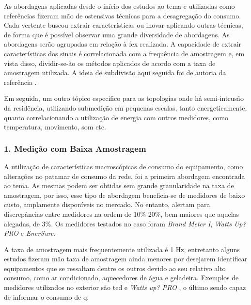 As abordagens aplicadas desde o início dos estudos ao tema e
utilizadas como referências fizeram mão de ostensivas técnicas para a
desagregação do consumo. Cada vertente buscou extrair características
ou inovar aplicando outras técnicas, de forma que é possível observar
uma grande diversidade de abordagens. As abordagens serão agrupadas em
relação à \gls{fex} realizada. A capacidade de extrair
características dos sinais é correlacionada com a frequência de
amostragem e, em vista disso, dividir-se-ão os métodos aplicados de
acordo com a taxa de amostragem utilizada. A ideia de subdivisão aqui
seguida foi de autoria da referência \cite{nilm_zeifman_review_2011}.

Em seguida, um outro tópico especifico para as topologias onde há
semi-intrusão da residência, utilizando submedição em pequenas
escalas, tanto energeticamente, quanto correlacionando a utilização de
energia com outros medidores, como temperatura, movimento, som etc.

\subsubsection{1. Medição com Baixa Amostragem}
\label{top:nilm_baixa_am}

A utilização de características macroscópicas de consumo do equipamento,
como alterações no patamar de consumo da rede, foi a
primeira abordagem encontrada ao tema. As mesmas podem ser obtidas sem
grande granularidade na taxa de amostragem, por isso, esse tipo de
abordagem beneficia-se de medidores de baixo custo, amplamente
disponíveis no mercado. No entanto,
\cite{nilm_berges_2008_7,nilm_matthews_overview_2008_22} alertam
para discrepâncias entre medidores na ordem de 10\%-20\%, bem maiores
que aquelas alegadas, de 3\%. Os medidores testados no caso foram
\emph{Brand Meter I}, \emph{Watts Up? PRO} e \emph{EnerSure}.

A taxa de amostragem mais frequentemente utilizada é 1 Hz, entretanto
alguns estudos fizeram mão taxa de amostragem ainda menores por
desejarem identificar equipamentos que se ressaltam dentre os outros
devido ao seu relativo alto consumo, como ar condicionado, aquecedores
de água e geladeira. Exemplos de medidores utilizados no exterior são
\gls{ted} \cite{ted_site} e \emph{Watts up? PRO} \cite{wattsup_site},
o último sendo capaz de informar o consumo de \acl{q}.

